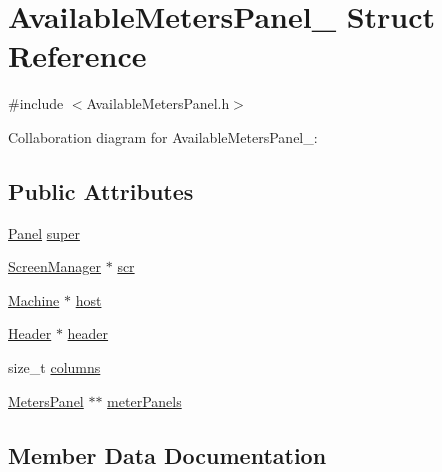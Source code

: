 \hypertarget{structAvailableMetersPanel__}{}\section{Available\+Meters\+Panel\+\_\+ Struct Reference}
\label{structAvailableMetersPanel__}


{\ttfamily \#include $<$Available\+Meters\+Panel.\+h$>$}



Collaboration diagram for Available\+Meters\+Panel\+\_\+\+:
\subsection*{Public Attributes}
\begin{DoxyCompactItemize}
\item 
\hyperlink{Panel_8h_a034d4c16521db412dc7a1e8536d16fae}{Panel} \hyperlink{structAvailableMetersPanel___a96b169ffe77fd5e14f72d8d529bcfb9e}{super}
\item 
\hyperlink{ScreenManager_8h_a798c9c69dc8024a4c6829982bf94dddd}{Screen\+Manager} $\ast$ \hyperlink{structAvailableMetersPanel___ae9e5fa9eb12dd45b8478efb344752d04}{scr}
\item 
\hyperlink{Machine_8h_aa3706f95e4706b9d02979efcabb1341d}{Machine} $\ast$ \hyperlink{structAvailableMetersPanel___aff01494f9b7059b74d8724be1231f346}{host}
\item 
\hyperlink{linux_2download_2htop-3_83_80_2Header_8h_a7f4dfcf80c34406946a7bda3d88d5e36}{Header} $\ast$ \hyperlink{structAvailableMetersPanel___a9537fc5d1ba3659124de5d7d77e706df}{header}
\item 
size\+\_\+t \hyperlink{structAvailableMetersPanel___af142e50b48e32c2da399a5e2b4af8009}{columns}
\item 
\hyperlink{MetersPanel_8h_ac168f5e3e3c144e958020ce7b0ed33a3}{Meters\+Panel} $\ast$$\ast$ \hyperlink{structAvailableMetersPanel___a85aa5c06f338f4722d86bb97ae6bc873}{meter\+Panels}
\end{DoxyCompactItemize}


\subsection{Member Data Documentation}
\mbox{\label{structAvailableMetersPanel___af142e50b48e32c2da399a5e2b4af8009}} 
